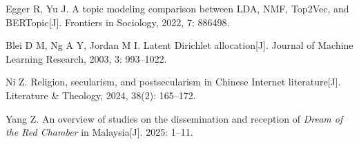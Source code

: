 \documentclass[12pt, a4paper]{article}
\begin{document}
{\noindent [42] Egger R, Yu J. A topic modeling comparison between LDA, NMF, Top2Vec, and BERTopic[J]. Frontiers in Sociology, 2022, 7: 886498.

\noindent [43] Blei D M, Ng A Y, Jordan M I. Latent Dirichlet allocation[J]. Journal of Machine Learning Research, 2003, 3: 993--1022.





\noindent [48] Ni Z. Religion, secularism, and postsecularism in Chinese Internet literature[J]. Literature \& Theology, 2024, 38(2): 165--172.



\noindent [51] Yang Z. An overview of studies on the dissemination and reception of \textit{Dream of the Red Chamber} in Malaysia[J]. 2025: 1--11.




}
\end{document}
